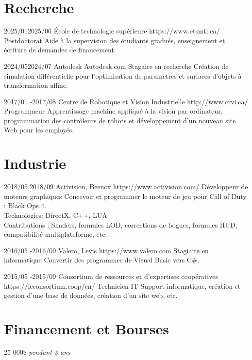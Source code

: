 \documentclass[10pt]{article} %
\begin{document}
\section{Recherche}
\job
{2025/01}{2025/06}
{École de technologie supérieure}
{https://www.etsmtl.ca/}
{Postdoctorat}
{Aide à la supervision des étudiants gradués, enseignement et écriture de demandes de financement.}

\job
{2024/05}{2024/07}
{Autodesk}
{Autodesk.com}
{Stagaire en recherche}
{Création de simulation différentielle pour l'optimisation de paramètres et surfaces d'objets à transformation affine.}

\job
{2017/01 -}{2017/08}
{Centre de Robotique et Vision Industrielle}
{http://www.crvi.ca/}
{Programmeur}
{Apprentissage machine appliqué à la vision par ordinateur, programmation des contrôleurs de robots et développement d'un nouveau
site Web pour les employés.}

\section{Industrie}
\job
{2018/05,}{2018/09}
{Activision, Beenox}
{https://www.activision.com/}
{Développeur de moteurs graphiques}
{Concevoir et programmer le moteur de jeu pour Call of Duty : Black Ops 4.\\
 Technologies: DirectX, C++, LUA \\
 Contributions : Shaders, formules LOD, corrections de bogues, formules HUD, compatibilité multiplateforme, etc.}

\job
{2016/05 -}{2016/09}
{Valero, Levis}
{https://www.valero.com}
{Stagiaire en informatique}
{Convertir des programmes de Visual Basic vers C\#.}

\job
{2015/05 -}{2015/09}
{Consortium de ressources et d'expertises coopératives}
{https://leconsortium.coop/en/}
{Technicien IT}
{Support informatique, création et gestion d'une base de données, création d'un site web, etc.}


\section{Financement et Bourses}

{
 25 000\$  \textit{pendant 3 ans}\\
}
\end{document}
